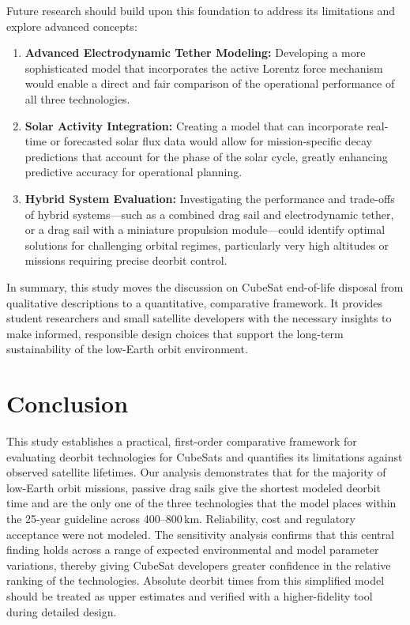 \documentclass[11pt,a4paper]{article}
\begin{document}
Future research should build upon this foundation to address its limitations and explore advanced concepts:
\begin{enumerate}
\item \textbf{Advanced Electrodynamic Tether Modeling:} Developing a more sophisticated model that incorporates the active Lorentz force mechanism would enable a direct and fair comparison of the operational performance of all three technologies.
\item \textbf{Solar Activity Integration:} Creating a model that can incorporate real-time or forecasted solar flux data would allow for mission-specific decay predictions that account for the phase of the solar cycle, greatly enhancing predictive accuracy for operational planning.
\item \textbf{Hybrid System Evaluation:} Investigating the performance and trade-offs of hybrid systems---such as a combined drag sail and electrodynamic tether, or a drag sail with a miniature propulsion module---could identify optimal solutions for challenging orbital regimes, particularly very high altitudes or missions requiring precise deorbit control.
\end{enumerate}
In summary, this study moves the discussion on CubeSat end-of-life disposal from qualitative descriptions to a quantitative, comparative framework. It provides student researchers and small satellite developers with the necessary insights to make informed, responsible design choices that support the long-term sustainability of the low-Earth orbit environment.

\section{Conclusion}
This study establishes a practical, first-order comparative framework for evaluating deorbit technologies for CubeSats and quantifies its limitations against observed satellite lifetimes. Our analysis demonstrates that for the majority of low-Earth orbit missions, passive drag sails give the shortest modeled deorbit time and are the only one of the three technologies that the model places within the 25-year guideline across 400--800\,km. Reliability, cost and regulatory acceptance were not modeled. The sensitivity analysis confirms that this central finding holds across a range of expected environmental and model parameter variations, thereby giving CubeSat developers greater confidence in the relative ranking of the technologies. Absolute deorbit times from this simplified model should be treated as upper estimates and verified with a higher-fidelity tool during detailed design.
\end{document}
